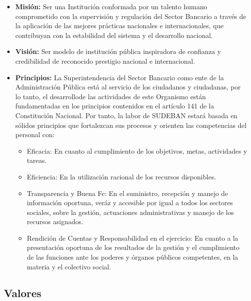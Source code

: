 \documentclass[]{article}
\providecommand{\tightlist}{%
  \setlength{\itemsep}{0pt}\setlength{\parskip}{0pt}}
\begin{document}
\begin{itemize}
\tightlist
\item
  \textbf{Misión:} Ser una Institución conformada por un talento humano
  comprometido con la supervisión y regulación del Sector Bancario a
  través de la aplicación de las mejores prácticas nacionales e
  internacionales, que contribuyan con la estabilidad del sistema y el
  desarrollo nacional.
\item
  \textbf{Visión:} Ser modelo de institución pública inspiradora de
  confianza y credibilidad de reconocido prestigio nacional e
  internacional.
\item
  \textbf{Principios:} La Superintendencia del Sector Bancario como ente
  de la Administración Pública está al servicio de los ciudadanos y
  ciudadanas, por lo tanto, el desarrollode las actividades de este
  Organismo están fundamentadas en los principios contenidos en el
  artículo 141 de la Constitución Nacional. Por tanto, la labor de
  SUDEBAN estará basada en sólidos principios que fortalezcan sus
  procesos y orienten las competencias del personal con:

  \begin{itemize}
  \tightlist
  \item
    Eficacia: En cuanto al cumplimiento de los objetivos, metas,
    actividades y tareas.
  \item
    Eficiencia: En la utilización racional de los recursos disponibles.
  \item
    Transparencia y Buena Fe: En el suministro, recepción y manejo de
    información oportuna, veráz y accesible por igual a todos los
    sectores sociales, sobre la gestión, actuaciones administrativas y
    manejo de los recursos asignados.
  \item
    Rendición de Cuentas y Responsabilidad en el ejercicio: En cuanto a
    la presentación oportuna de los resultados de la gestión y el
    cumplimiento de las funciones ante los poderes y órganos públicos
    competentes, en la materia y el colectivo social.
  \end{itemize}
\end{itemize}

\hypertarget{valores}{%
\subsection{Valores}\label{valores}}
\end{document}
